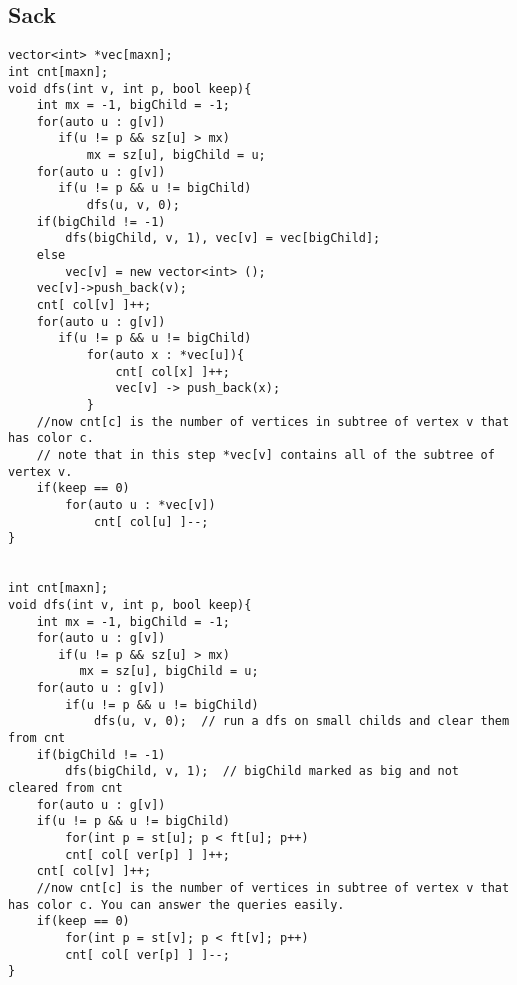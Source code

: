 \documentclass{article}
\begin{document}
\subsection{Sack}
\begin{verbatim}
vector<int> *vec[maxn];
int cnt[maxn];
void dfs(int v, int p, bool keep){
    int mx = -1, bigChild = -1;
    for(auto u : g[v])
       if(u != p && sz[u] > mx)
           mx = sz[u], bigChild = u;
    for(auto u : g[v])
       if(u != p && u != bigChild)
           dfs(u, v, 0);
    if(bigChild != -1)
        dfs(bigChild, v, 1), vec[v] = vec[bigChild];
    else
        vec[v] = new vector<int> ();
    vec[v]->push_back(v);
    cnt[ col[v] ]++;
    for(auto u : g[v])
       if(u != p && u != bigChild)
           for(auto x : *vec[u]){
               cnt[ col[x] ]++;
               vec[v] -> push_back(x);
           }
    //now cnt[c] is the number of vertices in subtree of vertex v that has color c.
    // note that in this step *vec[v] contains all of the subtree of vertex v.
    if(keep == 0)
        for(auto u : *vec[v])
            cnt[ col[u] ]--;
}


int cnt[maxn];
void dfs(int v, int p, bool keep){
    int mx = -1, bigChild = -1;
    for(auto u : g[v])
       if(u != p && sz[u] > mx)
          mx = sz[u], bigChild = u;
    for(auto u : g[v])
        if(u != p && u != bigChild)
            dfs(u, v, 0);  // run a dfs on small childs and clear them from cnt
    if(bigChild != -1)
        dfs(bigChild, v, 1);  // bigChild marked as big and not cleared from cnt
    for(auto u : g[v])
	if(u != p && u != bigChild)
	    for(int p = st[u]; p < ft[u]; p++)
		cnt[ col[ ver[p] ] ]++;
    cnt[ col[v] ]++;
    //now cnt[c] is the number of vertices in subtree of vertex v that has color c. You can answer the queries easily.
    if(keep == 0)
        for(int p = st[v]; p < ft[v]; p++)
	    cnt[ col[ ver[p] ] ]--;
}
\end{verbatim}
\end{document}
